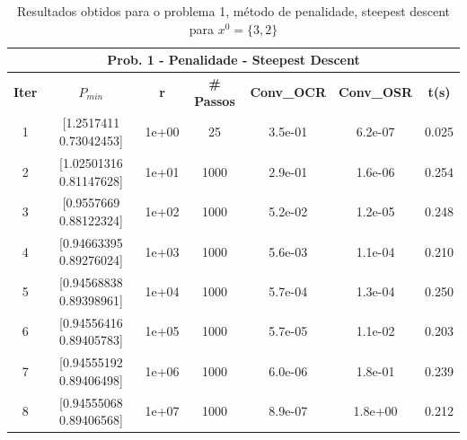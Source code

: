 \documentclass[10pt, a4paper]{article}
\begin{document}
\vspace{5mm}
\begin{table}[H]
  \begin{center}
    \begin{tabular}{c|c|c|c|c|c|c}
      \multicolumn{7}{c}{\textbf{Prob. 1 - Penalidade - Steepest Descent}}\\
      \hline
      \textbf{Iter} & \textbf{$P_{min}$} & \textbf{r} & \textbf{\# Passos} & \textbf{Conv\_OCR} & \textbf{Conv\_OSR} & \textbf{t(s)}\\
      \hline
        1& [1.2517411  0.73042453]& 1e+00& 25& 3.5e-01& 6.2e-07& 0.025    \\
        2& [1.02501316 0.81147628]& 1e+01& 1000& 2.9e-01& 1.6e-06& 0.254\\
        3& [0.9557669  0.88122324]& 1e+02& 1000& 5.2e-02& 1.2e-05& 0.248\\
        4& [0.94663395 0.89276024]& 1e+03& 1000& 5.6e-03& 1.1e-04& 0.210\\
        5& [0.94568838 0.89398961]& 1e+04& 1000& 5.7e-04& 1.3e-04& 0.250\\
        6& [0.94556416 0.89405783]& 1e+05& 1000& 5.7e-05& 1.1e-02& 0.203\\
        7& [0.94555192 0.89406498]& 1e+06& 1000& 6.0e-06& 1.8e-01& 0.239\\
        8& [0.94555068 0.89406568]& 1e+07& 1000& 8.9e-07& 1.8e+00& 0.212\\
    \end{tabular}
  \end{center}
  \caption{Resultados obtidos para o problema 1, método de penalidade, steepest descent para $x^0=\{3,2\}$}
\end{table}
\end{document}
